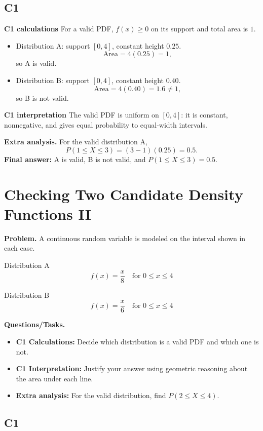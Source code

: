\subsection*{C1}

\textbf{C1 calculations}
For a valid PDF, $f(x)\ge 0$ on its support and total area is $1$.
\begin{itemize}
	\item Distribution A: support $[0,4]$, constant height $0.25$.
	\[
	\text{Area}=4(0.25)=1,
	\]
	so A is valid.
	\item Distribution B: support $[0,4]$, constant height $0.40$.
	\[
	\text{Area}=4(0.40)=1.6\ne1,
	\]
	so B is not valid.
\end{itemize}

\textbf{C1 interpretation}
The valid PDF is uniform on $[0,4]$: it is constant, nonnegative, and gives equal probability to equal-width intervals.

\textbf{Extra analysis.}
For the valid distribution A,
\[
P(1\le X\le 3)=(3-1)(0.25)=0.5.
\]
\textbf{Final answer:} A is valid, B is not valid, and $P(1\le X\le 3)=0.5$.

	\section{Checking Two Candidate Density Functions II}
	
	\textbf{Problem.}
	A continuous random variable is modeled on the interval shown in each case.
	
	Distribution A
	\[
	f(x)=\frac{x}{8}\quad\text{for }0\le x\le 4
	\]
	
	Distribution B
	\[
	f(x)=\frac{x}{6}\quad\text{for }0\le x\le 4
	\]
	
	\textbf{Questions/Tasks.}
	\begin{itemize}
		\item \textbf{C1 Calculations:} Decide which distribution is a valid PDF and which one is not.
		\item \textbf{C1 Interpretation:} Justify your answer using geometric reasoning about the area under each line.
		\item \textbf{Extra analysis:} For the valid distribution, find $P(2\le X\le 4)$.
	\end{itemize}

	\subsection*{C1}

